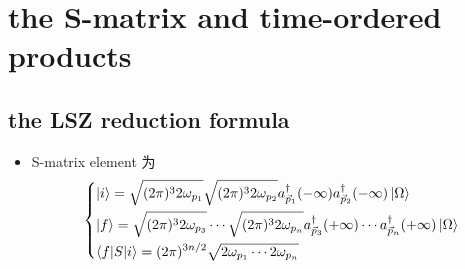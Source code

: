 \chapter{the S-matrix and time-ordered products}
\section{the LSZ reduction formula}
\begin{itemize}
	\item S-matrix element 为
	\begin{equation}
		\begin{dcases}
			\ket{i} = \sqrt{(2 \pi)^3 2 \omega_{p_1}} \sqrt{(2 \pi)^3 2 \omega_{p_2}} a^\dag_{\vec{p}_1}(- \infty) a^\dag_{\vec{p}_2}(- \infty) \ket{\Omega} \\
			\ket{f} = \sqrt{(2 \pi)^3 2 \omega_{p_3}} \cdots \sqrt{(2 \pi)^3 2 \omega_{p_n}} a^\dag_{\vec{p}_3}(+ \infty) \cdots a^\dag_{\vec{p}_n}(+ \infty) \ket{\Omega} \\
			\braket{f | S | i} = (2 \pi)^{3 n / 2} \sqrt{2 \omega_{p_1} \cdots 2 \omega_{p_n}}
		\end{dcases}
	\end{equation}
\end{itemize}
